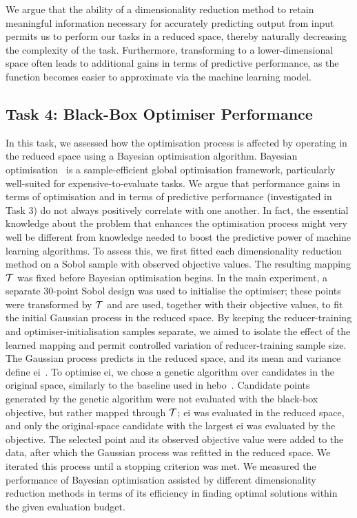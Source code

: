 We argue that the ability of a dimensionality reduction method to retain meaningful information necessary for accurately predicting output from input
permits us to perform our tasks in a reduced space, thereby naturally decreasing the complexity of the task.
Furthermore, transforming to a lower-dimensional space often leads to additional gains in terms of predictive performance, as the function becomes easier to approximate via the machine learning model.

\FloatBarrier
\subsection{Task 4: Black-Box Optimiser Performance}
\label{sec:ch05:method-bbo-task3}
In this task, we assessed how the optimisation process is affected by operating in the reduced space using a Bayesian optimisation algorithm.
Bayesian optimisation~\citep{Garnett23}
is a sample-efficient global optimisation framework, particularly well-suited for expensive-to-evaluate tasks.
We argue that performance gains in terms of optimisation and in terms of predictive performance (investigated in Task 3) do not always positively correlate with one another.
In fact, the essential knowledge about the problem that enhances the optimisation process might very well be different from knowledge needed to boost the predictive power of machine learning algorithms.
To assess this, we first fitted each dimensionality reduction method on a Sobol sample with observed objective values. The resulting mapping $\mathcal{T}$ was fixed before Bayesian optimisation begins. In the main experiment, a separate 30-point Sobol design was used to initialise the optimiser; these points were transformed by $\mathcal{T}$ and are used, together with their objective values, to fit the initial Gaussian process in the reduced space. By keeping the reducer-training and optimiser-initialisation samples separate, we aimed to isolate the effect of the learned mapping and permit controlled variation of reducer-training sample size.
The Gaussian process predicts in the reduced space, and its mean and variance define \gls{ei}~\citep{ForEtAl08b}. To optimise \gls{ei}, we chose a genetic algorithm over candidates in the original space, similarly to the baseline used in \gls{hebo}~\citep{CowEtAl22}. Candidate points generated by the genetic algorithm were not evaluated with the black-box objective, but rather mapped through $\mathcal{T}$; \gls{ei} was evaluated in the reduced space, and only the original-space candidate with the largest \gls{ei} was evaluated by the objective.
The selected point and its observed objective value were added to the data, after which the Gaussian process was refitted in the reduced space.
We iterated this process until a stopping criterion was met.
We measured the performance of Bayesian optimisation assisted by different dimensionality reduction methods in terms of its efficiency in finding optimal solutions within the given evaluation budget.

